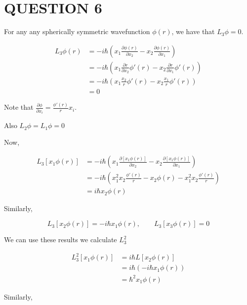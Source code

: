 \documentclass[a4paper]{article}
\begin{document}
\section{QUESTION 6}

For any any spherically symmetric wavefunction $ \phi(r) $, we have that $ L_{3} \phi = 0$.

\begin{align*}
L_{3} \phi(r) & = - i \hbar \left(  x_{1} \frac{\partial \phi(r)}{\partial x_{2}}   - x_{2}  \frac{\partial \phi(r) }{\partial x_{1} }\right)      \\
& = - i \hbar \left(  x_{1} \frac{\partial r}{\partial x_{2}} \phi'(r)   - x_{2}  \frac{\partial r }{\partial x_{1} } \phi'(r) \right) \\
& = - i \hbar \left(  x_{1} \frac{x_{2}}{r} \phi'(r)   - x_{2}  \frac{x_{1}}{r} \phi'(r) \right) \\
& = 0                                                            
\end{align*}   

Note that $ \frac{\partial \phi }{\partial x_{i}} = \frac{\phi'(r)}{r} x_{i} $.

Also $ L_{2}\phi = L_{1} \phi = 0  $

Now,

\begin{align*}
L_{3}[ x_{1} \phi(r) ] & = - i \hbar \left(  x_{1} \frac{\partial [ x_{1} \phi(r) ]}{\partial x_{2}}   - x_{2}  \frac{\partial [ x_{1} \phi(r) ]}{\partial x_{1} }\right)      \\
& = - i \hbar \left(  x_{1}^{2} x_{2} \frac{\phi'(r)}{r}   - x_{2} \phi(r) -  x_{1}^{2} x_{2} \frac{\phi'(r)}{r}  \right) \\
& =  i \hbar x_{2} \phi(r)                                                           
\end{align*} 

Similarly,

\[ L_{3}[ x_{2} \phi(r) ] = -i \hbar x_{1} \phi(r), \qquad L_{3}[x_{3}\phi(r)] = 0   \]


We can use these results we calculate $ L_{3}^{2} $

\begin{align*}
L_{3}^{2} [ x_{1} \phi(r) ] & = i \hbar  L [x_{2} \phi(r) ]\\
& = i \hbar (-i \hbar x_{1} \phi(r))\\
& = \hbar^{2} x_{1} \phi(r)
\end{align*}

Similarly,
\end{document}
